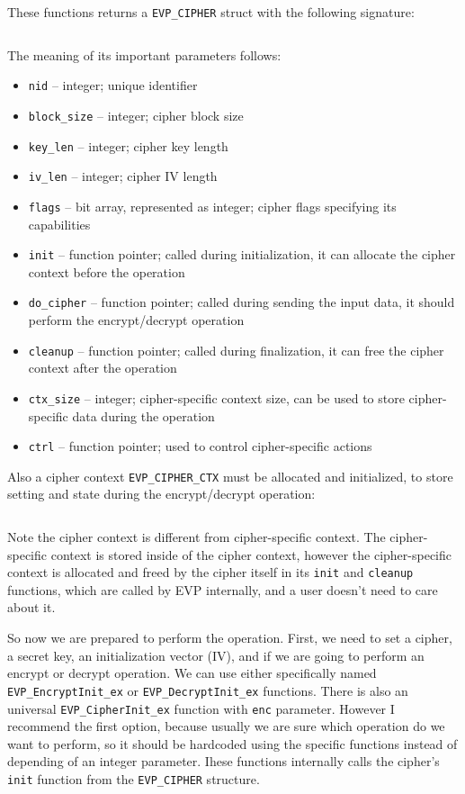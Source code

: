 These functions returns a \texttt{EVP\_CIPHER} struct with the following signature:

\inputminted{c}{code/openssl-evp-cipher.c}

The meaning of its important parameters follows:

\begin{itemize}
  \item \texttt{nid} -- integer; unique identifier
  \item \texttt{block\_size} -- integer; cipher block size
  \item \texttt{key\_len} -- integer; cipher key length
  \item \texttt{iv\_len} -- integer; cipher IV length
  \item \texttt{flags} -- bit array, represented as integer; cipher flags specifying its capabilities
  \item \texttt{init} -- function pointer; called during initialization, it can allocate the cipher context before the operation
  \item \texttt{do\_cipher} -- function pointer; called during sending the input data, it should perform the encrypt/decrypt operation
  \item \texttt{cleanup} -- function pointer; called during finalization, it can free the cipher context after the operation
  \item \texttt{ctx\_size} -- integer; cipher-specific context size, can be used to store cipher-specific data during the operation
  \item \texttt{ctrl} -- function pointer; used to control cipher-specific actions
\end{itemize}

Also a cipher context \texttt{EVP\_CIPHER\_CTX} must be allocated and initialized, to store setting and state during the encrypt/decrypt operation:

\inputminted{c}{code/openssl-evp-cipher-ctx-new.c}

Note the cipher context is different from cipher-specific context. The cipher-specific context is stored inside of the cipher context, however the cipher-specific context is allocated and freed by the cipher itself in its \texttt{init} and \texttt{cleanup} functions, which are called by EVP internally, and a user doesn't need to care about it.

So now we are prepared to perform the operation. First, we need to set a cipher, a secret key, an initialization vector (IV), and if we are going to perform an encrypt or decrypt operation. We can use either specifically named \texttt{EVP\_EncryptInit\_ex} or \texttt{EVP\_DecryptInit\_ex} functions. There is also an universal \texttt{EVP\_CipherInit\_ex} function with \texttt{enc} parameter. However I recommend the first option, because usually we are sure which operation do we want to perform, so it should be hardcoded using the specific functions instead of depending of an integer parameter. Ihese functions internally calls the cipher's \texttt{init} function from the \texttt{EVP\_CIPHER} structure.

